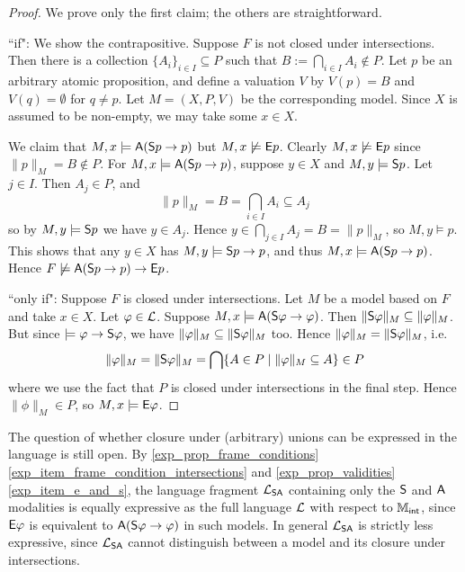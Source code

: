 \begin{proof}

    We prove only the first claim; the others are straightforward.

    ``if": We show the contrapositive. Suppose $F$ is not closed under
    intersections. Then there is a collection $\{A_i\}_{i \in I} \subseteq P$
    such that $B := \bigcap_{i \in I}A_i \notin P$. Let $p$ be an arbitrary
    atomic proposition, and define a valuation $V$ by $V(p) = B$ and $V(q) =
    \emptyset$ for $q \ne p$. Let $M = (X, P, V)$ be the corresponding model.
    Since $X$ is assumed to be non-empty, we may take some $x \in X$.

    We claim that $M, x \models \A(\S p \limplies p)$ but $M, x
    \not\models \E p$. Clearly $M, x \not\models \E p$ since
    $\|p\|_M = B \notin P$. For $M, x \models \A(\S p \limplies
    p)$, suppose $y \in X$ and $M, y \models \S p$. Let $j
    \in I$. Then $A_j \in P$, and
    \[
        \|p\|_M
        = B
        = \bigcap_{i \in I}{A_i}
        \subseteq A_j
    \]
    so by $M, y \models \S p$ we have $y \in A_j$. Hence $y
    \in \bigcap_{j \in I}A_j = B = \|p\|_M$, so $M, y \models p$. This
    shows that any $y \in X$ has $M, y \models \S p \limplies p$,
    and thus $M, x \models \A(\S p \limplies p)$. Hence $F
    \not\models \A(\S p \limplies p) \limplies \E p$.

    ``only if": Suppose $F$ is closed under intersections. Let $M$
    be a model based on $F$ and take $x \in X$. Let $\phi
    \in \cL$. Suppose $M, x \models \A(\S\phi \limplies \phi)$. Then
    $\|\S\phi\|_M \subseteq \|\phi\|_M$. But since $\models \phi
    \limplies \S\phi$, we have $\|\phi\|_M \subseteq \|\S\phi\|_M$ too.
    Hence $\|\phi\|_M = \|\S\phi\|_M$, i.e.
    \[
        \|\phi\|_M
        = \|\S\phi\|_M
        = \bigcap\{A \in P \mid \|\phi\|_M \subseteq A\}
        \in P
    \]
    where we use the fact that $P$ is closed under intersections in the
    final step. Hence $\|\phi\|_M \in P$, so $M, x \models
    \E\phi$.
\end{proof}

The question of whether closure under (arbitrary) unions can be expressed in
the language is still open. By \cref{exp_prop_frame_conditions}
\cref{exp_item_frame_condition_intersections} and \cref{exp_prop_validities}
\cref{exp_item_e_and_s}, the language fragment $\cLSA$ containing only the $\S$
and $\A$ modalities is equally expressive as the full language $\cL$ with
respect to $\Mint$, since $\E\phi$ is equivalent to $\A(\S\phi \limplies \phi)$
in such models. In general $\cLSA$ is strictly less expressive, since $\cLSA$
cannot distinguish between a model and its closure under intersections.

